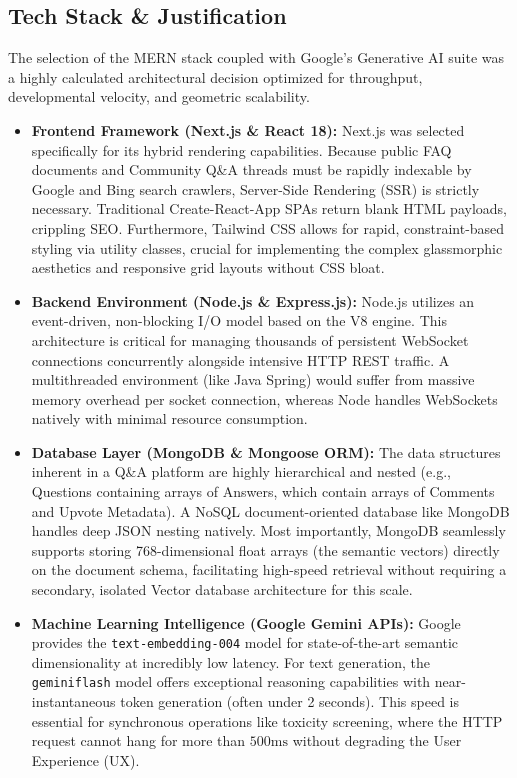 \documentclass[12pt,a4paper]{article}
\begin{document}
\subsection{Tech Stack \& Justification}
The selection of the MERN stack coupled with Google's Generative AI suite was a highly calculated architectural decision optimized for throughput, developmental velocity, and geometric scalability.

\begin{itemize}
    \item \textbf{Frontend Framework (Next.js \& React 18):} Next.js was selected specifically for its hybrid rendering capabilities. Because public FAQ documents and Community Q\&A threads must be rapidly indexable by Google and Bing search crawlers, Server-Side Rendering (SSR) is strictly necessary. Traditional Create-React-App SPAs return blank HTML payloads, crippling SEO. Furthermore, Tailwind CSS allows for rapid, constraint-based styling via utility classes, crucial for implementing the complex glassmorphic aesthetics and responsive grid layouts without CSS bloat.
    
    \item \textbf{Backend Environment (Node.js \& Express.js):} Node.js utilizes an event-driven, non-blocking I/O model based on the V8 engine. This architecture is critical for managing thousands of persistent WebSocket connections concurrently alongside intensive HTTP REST traffic. A multithreaded environment (like Java Spring) would suffer from massive memory overhead per socket connection, whereas Node handles WebSockets natively with minimal resource consumption.
    
    \item \textbf{Database Layer (MongoDB \& Mongoose ORM):} The data structures inherent in a Q\&A platform are highly hierarchical and nested (e.g., Questions containing arrays of Answers, which contain arrays of Comments and Upvote Metadata). A NoSQL document-oriented database like MongoDB handles deep JSON nesting natively. Most importantly, MongoDB seamlessly supports storing 768-dimensional float arrays (the semantic vectors) directly on the document schema, facilitating high-speed retrieval without requiring a secondary, isolated Vector database architecture for this scale.
    
    \item \textbf{Machine Learning Intelligence (Google Gemini APIs):} Google provides the \texttt{text-embedding-004} model for state-of-the-art semantic dimensionality at incredibly low latency. For text generation, the \texttt{gemini\-flash} model offers exceptional reasoning capabilities with near-instantaneous token generation (often under 2 seconds). This speed is essential for synchronous operations like toxicity screening, where the HTTP request cannot hang for more than $500\text{ms}$ without degrading the User Experience (UX).
    

\end{itemize}
\end{document}
